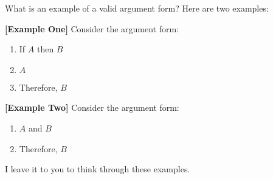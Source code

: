 \documentclass[
]{book}
\providecommand{\tightlist}{%
  \setlength{\itemsep}{0pt}\setlength{\parskip}{0pt}}
\begin{document}
What is an example of a valid argument form? Here are two examples:

\textbf{{[}Example One{]}} Consider the argument form:

\begin{enumerate}
\def\labelenumi{\arabic{enumi}.}
\tightlist
\item
  If \(A\) then \(B\)
\item
  \(A\)
\item
  Therefore, \(B\)
\end{enumerate}

\textbf{{[}Example Two{]}} Consider the argument form:

\begin{enumerate}
\def\labelenumi{\arabic{enumi}.}
\tightlist
\item
  \(A\) and \(B\)
\item
  Therefore, \(B\)
\end{enumerate}

I leave it to you to think through these examples.

  
\end{document}
